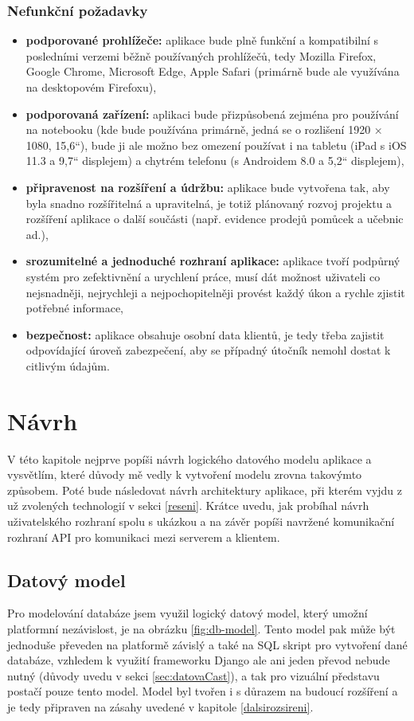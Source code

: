     \subsection{Nefunkční požadavky}
    \begin{itemize}
        \item \textbf{podporované prohlížeče:} aplikace bude plně funkční a kompatibilní s posledními verzemi běžně používaných prohlížečů, tedy Mozilla Firefox, Google Chrome, Microsoft Edge, Apple Safari (primárně bude ale využívána na desktopovém Firefoxu),
        \item \textbf{podporovaná zařízení:} aplikaci bude přizpůsobená zejména pro používání na notebooku (kde bude používána primárně, jedná se o rozlišení 1920 × 1080, 15,6“), bude ji ale možno bez omezení používat i na tabletu (iPad s iOS 11.3 a 9,7“ displejem) a chytrém telefonu (s Androidem 8.0 a 5,2“ displejem),
        \item \textbf{připravenost na rozšíření a údržbu:} aplikace bude vytvořena tak, aby byla snadno rozšířitelná a upravitelná, je totiž plánovaný rozvoj projektu a rozšíření aplikace o další součásti (např. evidence prodejů pomůcek a učebnic ad.),
        \item \textbf{srozumitelné a jednoduché rozhraní aplikace:} aplikace tvoří podpůrný systém pro zefektivnění a urychlení práce, musí dát možnost uživateli co nejsnadněji, nejrychleji a nejpochopitelněji provést každý úkon a rychle zjistit potřebné informace,
        \item \textbf{bezpečnost:} aplikace obsahuje osobní data klientů, je tedy třeba zajistit odpovídající úroveň zabezpečení, aby se případný útočník nemohl dostat k citlivým údajům.
    \end{itemize}
    
\chapter{Návrh}
V této kapitole nejprve popíši návrh logického datového modelu aplikace a vysvětlím, které důvody mě vedly k vytvoření modelu zrovna takovýmto způsobem. Poté bude následovat návrh architektury aplikace, při kterém vyjdu z už zvolených technologií v sekci \ref{reseni}. Krátce uvedu, jak probíhal návrh uživatelského rozhraní spolu s ukázkou a na závěr popíši navržené komunikační rozhraní API pro komunikaci mezi serverem a klientem. 

    \section{Datový model}\label{datovymodel}
    Pro modelování databáze jsem využil logický datový model, který umožní platformní nezávislost, je na obrázku \ref{fig:db-model}. Tento model pak může být jednoduše převeden na platformě závislý a také na SQL skript pro vytvoření dané databáze, vzhledem k využití frameworku Django ale ani jeden převod nebude nutný (důvody uvedu v sekci \ref{sec:datovaCast}), a tak pro vizuální představu postačí pouze tento model. Model byl tvořen i s důrazem na budoucí rozšíření a je tedy připraven na zásahy uvedené v kapitole \ref{dalsirozsireni}.
    
